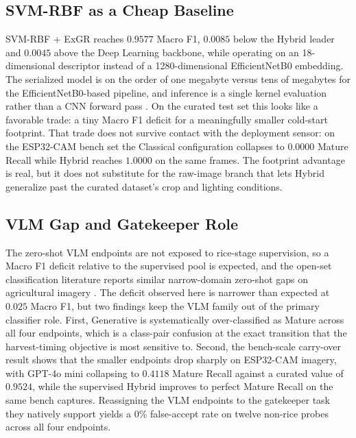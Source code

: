 \documentclass[conference]{IEEEtran}
\begin{document}
\subsection{SVM-RBF as a Cheap Baseline}
SVM-RBF + ExGR reaches $0.9577$ Macro F1, $0.0085$ below the Hybrid leader and $0.0045$ above the Deep Learning backbone, while operating on an 18-dimensional descriptor instead of a 1280-dimensional EfficientNetB0 embedding. The serialized model is on the order of one megabyte versus tens of megabytes for the EfficientNetB0-based pipeline, and inference is a single kernel evaluation rather than a CNN forward pass \cite{b_efficientnet,b_mobilenetv2}. On the curated test set this looks like a favorable trade: a tiny Macro F1 deficit for a meaningfully smaller cold-start footprint. That trade does not survive contact with the deployment sensor: on the ESP32-CAM bench set the Classical configuration collapses to $0.0000$ Mature Recall while Hybrid reaches $1.0000$ on the same frames. The footprint advantage is real, but it does not substitute for the raw-image branch that lets Hybrid generalize past the curated dataset's crop and lighting conditions.

\subsection{VLM Gap and Gatekeeper Role}
The zero-shot VLM endpoints are not exposed to rice-stage supervision, so a Macro F1 deficit relative to the supervised pool is expected, and the open-set classification literature reports similar narrow-domain zero-shot gaps on agricultural imagery \cite{b_geng,b_zhang,b_weedvlm}. The deficit observed here is narrower than expected at $0.025$ Macro F1, but two findings keep the VLM family out of the primary classifier role. First, Generative is systematically over-classified as Mature across all four endpoints, which is a class-pair confusion at the exact transition that the harvest-timing objective is most sensitive to. Second, the bench-scale carry-over result shows that the smaller endpoints drop sharply on ESP32-CAM imagery, with GPT-4o mini collapsing to $0.4118$ Mature Recall against a curated value of $0.9524$, while the supervised Hybrid improves to perfect Mature Recall on the same bench captures. Reassigning the VLM endpoints to the gatekeeper task they natively support yields a $0\%$ false-accept rate on twelve non-rice probes across all four endpoints.
\end{document}
